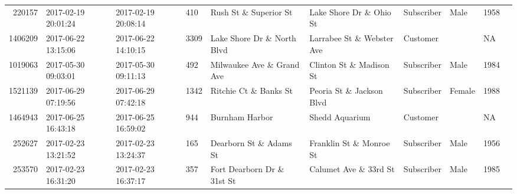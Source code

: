 \documentclass[11pt]{article}
\begin{document}
\begin{description}
\begin{tabular}{r|lllllllll}
	  220157                             & 2017-02-19 20:01:24                 & 2017-02-19 20:08:14                 &  410                                & Rush St \& Superior St             & Lake Shore Dr \& Ohio St           & Subscriber                          & Male                                & 1958                               \\
	 1406209                             & 2017-06-22 13:15:06                 & 2017-06-22 14:10:15                 & 3309                                & Lake Shore Dr \& North Blvd        & Larrabee St \& Webster Ave         & Customer                            &                                     &   NA                               \\
	 1019063                             & 2017-05-30 09:03:01                 & 2017-05-30 09:11:13                 &  492                                & Milwaukee Ave \& Grand Ave         & Clinton St \& Madison St           & Subscriber                          & Male                                & 1984                               \\
	 1521139                             & 2017-06-29 07:19:56                 & 2017-06-29 07:42:18                 & 1342                                & Ritchie Ct \& Banks St             & Peoria St \& Jackson Blvd          & Subscriber                          & Female                              & 1988                               \\
	 1464943                           & 2017-06-25 16:43:18               & 2017-06-25 16:59:02               &  944                              & Burnham Harbor                    & Shedd Aquarium                    & Customer                          &                                   &   NA                             \\
	  252627                             & 2017-02-23 13:21:52                 & 2017-02-23 13:24:37                 &  165                                & Dearborn St \& Adams St            & Franklin St \& Monroe St           & Subscriber                          & Male                                & 1956                               \\
	  253570                             & 2017-02-23 16:31:20                 & 2017-02-23 16:37:17                 &  357                                & Fort Dearborn Dr \& 31st St        & Calumet Ave \& 33rd St             & Subscriber                          & Male                                & 1985                               \\

\end{tabular}
\end{description}
\end{document}
